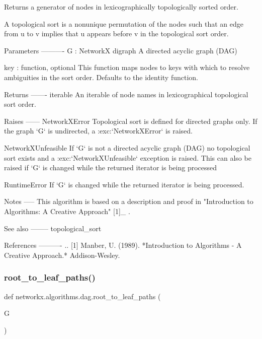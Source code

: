 \begin{DoxyVerb}Returns a generator of nodes in lexicographically topologically sorted
order.

A topological sort is a nonunique permutation of the nodes such that an
edge from u to v implies that u appears before v in the topological sort
order.

Parameters
----------
G : NetworkX digraph
    A directed acyclic graph (DAG)

key : function, optional
    This function maps nodes to keys with which to resolve ambiguities in
    the sort order.  Defaults to the identity function.

Returns
-------
iterable
    An iterable of node names in lexicographical topological sort order.

Raises
------
NetworkXError
    Topological sort is defined for directed graphs only. If the graph `G`
    is undirected, a :exc:`NetworkXError` is raised.

NetworkXUnfeasible
    If `G` is not a directed acyclic graph (DAG) no topological sort exists
    and a :exc:`NetworkXUnfeasible` exception is raised.  This can also be
    raised if `G` is changed while the returned iterator is being processed

RuntimeError
    If `G` is changed while the returned iterator is being processed.

Notes
-----
This algorithm is based on a description and proof in
"Introduction to Algorithms: A Creative Approach" [1]_ .

See also
--------
topological_sort

References
----------
.. [1] Manber, U. (1989).
   *Introduction to Algorithms - A Creative Approach.* Addison-Wesley.
\end{DoxyVerb}
 \mbox{\label{namespacenetworkx_1_1algorithms_1_1dag_aa6432469cf28a68ed889941626729667}} 
\subsubsection{\texorpdfstring{root\+\_\+to\+\_\+leaf\+\_\+paths()}{root\_to\_leaf\_paths()}}
{\footnotesize\ttfamily def networkx.\+algorithms.\+dag.\+root\+\_\+to\+\_\+leaf\+\_\+paths (\begin{DoxyParamCaption}\item[{}]{G }\end{DoxyParamCaption})}

